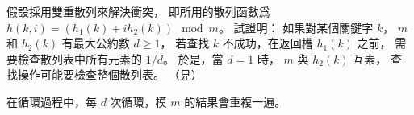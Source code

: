 \startEXERCISE\DIFFICULT
假設採用雙重散列來解決衝突，
即所用的散列函數爲 $h(k, i)=(h_1(k)+i h_2(k)) \mod m$。
試證明：
如果對某個關鍵字 $k$， $m$ 和 $h_2(k)$ 有最大公約數 $d\ge 1$，
若查找 $k$ 不成功，在返回槽 $h_1(k)$ 之前，
需要檢查散列表中所有元素的 $1/d$。
於是，當 $d=1$ 時， $m$ 與 $h_2(k)$ 互素，
查找操作可能要檢查整個散列表。
（\hint 見）
\stopEXERCISE

\startANSWER
在循環過程中，每 $d$ 次循環，模 $m$ 的結果會重複一遍。
\stopANSWER
